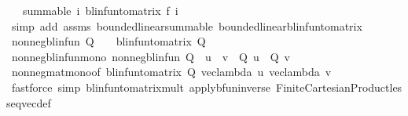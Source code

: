 \begin{isabellebody}
\ \ \ {\isachardoublequoteopen}summable\ {\isacharparenleft}{\kern0pt}{\isasymlambda}i{\isachardot}{\kern0pt}\ blinfun{\isacharunderscore}{\kern0pt}to{\isacharunderscore}{\kern0pt}matrix\ {\isacharparenleft}{\kern0pt}f\ i{\isacharparenright}{\kern0pt}{\isacharparenright}{\kern0pt}{\isachardoublequoteclose}\isanewline
%
\isadelimproof
\ \ %
\endisadelimproof
%
\isatagproof
{}\isamarkupfalse%
\ {\isacharparenleft}{\kern0pt}simp\ add{\isacharcolon}{\kern0pt}\ assms\ bounded{\isacharunderscore}{\kern0pt}linear{\isachardot}{\kern0pt}summable\ bounded{\isacharunderscore}{\kern0pt}linear{\isacharunderscore}{\kern0pt}blinfun{\isacharunderscore}{\kern0pt}to{\isacharunderscore}{\kern0pt}matrix{\isacharparenright}{\kern0pt}%
\endisatagproof
{\isafoldproof}%
%
\isadelimproof
\isanewline
%
\endisadelimproof
\isanewline
{}\isamarkupfalse%
\ {\isachardoublequoteopen}nonneg{\isacharunderscore}{\kern0pt}blinfun\ Q\ {\isasymequiv}\ {}\ {\isasymle}\ {\isacharparenleft}{\kern0pt}blinfun{\isacharunderscore}{\kern0pt}to{\isacharunderscore}{\kern0pt}matrix\ Q{\isacharparenright}{\kern0pt}{\isachardoublequoteclose}\isanewline
\isanewline
{}\isamarkupfalse%
\ nonneg{\isacharunderscore}{\kern0pt}blinfun{\isacharunderscore}{\kern0pt}mono{\isacharcolon}{\kern0pt}\ {\isachardoublequoteopen}nonneg{\isacharunderscore}{\kern0pt}blinfun\ Q\ {\isasymLongrightarrow}\ u\ {\isasymle}\ v\ {\isasymLongrightarrow}\ Q\ u\ {\isasymle}\ Q\ v{\isachardoublequoteclose}\isanewline
%
\isadelimproof
\ \ %
\endisadelimproof
%
\isatagproof
{}\isamarkupfalse%
\ nonneg{\isacharunderscore}{\kern0pt}mat{\isacharunderscore}{\kern0pt}mono{\isacharbrackleft}{\kern0pt}of\ {\isachardoublequoteopen}blinfun{\isacharunderscore}{\kern0pt}to{\isacharunderscore}{\kern0pt}matrix\ Q{\isachardoublequoteclose}\ {\isachardoublequoteopen}vec{\isacharunderscore}{\kern0pt}lambda\ u{\isachardoublequoteclose}\ {\isachardoublequoteopen}vec{\isacharunderscore}{\kern0pt}lambda\ v{\isachardoublequoteclose}{\isacharbrackright}{\kern0pt}\isanewline
\ \ \isamarkupfalse%
\ {\isacharparenleft}{\kern0pt}fastforce\ simp{\isacharcolon}{\kern0pt}\ blinfun{\isacharunderscore}{\kern0pt}to{\isacharunderscore}{\kern0pt}matrix{\isacharunderscore}{\kern0pt}mult{\isacharprime}{\kern0pt}{\isacharprime}{\kern0pt}\ apply{\isacharunderscore}{\kern0pt}bfun{\isacharunderscore}{\kern0pt}inverse\ Finite{\isacharunderscore}{\kern0pt}Cartesian{\isacharunderscore}{\kern0pt}Product{\isachardot}{\kern0pt}less{\isacharunderscore}{\kern0pt}eq{\isacharunderscore}{\kern0pt}vec{\isacharunderscore}{\kern0pt}def{\isacharparenright}{\kern0pt}%

\end{isabellebody}
